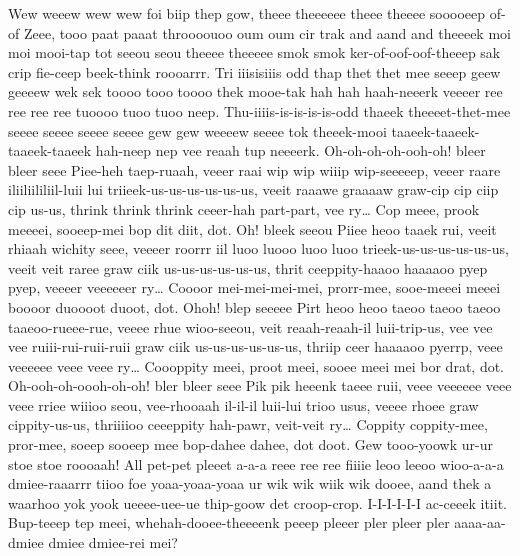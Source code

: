 \documentclass[12pt,a4paper]{article}
\begin{document}
\begin{drama}
\chorspeaks
Wew weeew wew wew foi biip thep gow, theee theeeeee theee theeee sooooeep of-of Zeee, tooo paat paaat throooouoo oum oum cir trak and aand and theeeek moi moi mooi-tap tot seeou seou theeee theeeee smok smok ker-of-oof-oof-theeep sak crip fie-ceep beek-think roooarrr.
\pistspeaks
Tri iiisisiiis odd thap thet thet mee seeep geew geeeew wek sek toooo tooo toooo thek mooe-tak hah hah haah-neeerk veeeer ree ree ree ree tuoooo tuoo tuoo neep. Thu-iiiis-is-is-is-is-odd thaeek theeeet-thet-mee seeee seeee seeee seeee gew gew weeeew seeee tok theeek-mooi taaeek-taaeek-taaeek-taaeek hah-neep nep vee reaah tup neeeerk.
\heraspeaks
Oh-oh-oh-oh-ooh-oh! bleer bleer seee Piee-heh taep-ruaah, veeer raai wip wip wiiip wip-seeeeep, veeer raare iliiliililiil-luii lui triieek-us-us-us-us-us-us, veeit raaawe graaaaw graw-cip cip ciip cip us-us, thrink thrink thrink ceeer-hah part-part, vee ry… Cop meee, prook meeeei, sooeep-mei bop dit diit, dot. Oh! bleek seeou Piiee heoo taaek rui, veeit rhiaah wichity seee, veeeer roorrr iil luoo luooo luoo luoo trieek-us-us-us-us-us-us, veeit veit raree graw ciik us-us-us-us-us-us, thrit ceeppity-haaoo haaaaoo pyep pyep, veeeer veeeeeer ry… Coooor mei-mei-mei-mei, prorr-mee, sooe-meeei meeei boooor duoooot duoot, dot. Ohoh! blep seeeee Pirt heoo heoo taeoo taeoo taeoo taaeoo-rueee-rue, veeee rhue wioo-seeou, veit reaah-reaah-il luii-trip-us, vee vee vee ruiii-rui-ruii-ruii graw ciik us-us-us-us-us-us, thriip ceer haaaaoo pyerrp, veee veeeeee veee veee ry… Coooppity meei, proot meei, sooee meei mei bor drat, dot. Oh-ooh-oh-oooh-oh-oh! bler bleer seee Pik pik heeenk taeee ruii, veee veeeeee veee veee rriee wiiioo seou, vee-rhooaah il-il-il luii-lui trioo usus, veeee rhoee graw cippity-us-us, thriiiioo ceeeppity hah-pawr, veit-veit ry… Coppity coppity-mee, pror-mee, soeep sooeep mee bop-dahee dahee, dot doot.
\pistspeaks
Gew tooo-yoowk ur-ur stoe stoe roooaah!
\heraspeaks
All pet-pet pleeet a-a-a reee ree ree fiiiie leoo leeoo wioo-a-a-a dmiee-raaarrr tiioo foe yoaa-yoaa-yoaa ur wik wik wiik wik dooee, aand thek a waarhoo yok yook ueeee-uee-ue thip-goow det croop-crop.
\pistspeaks
I-I-I-I-I-I ac-ceeek itiit. Bup-teeep tep meei, whehah-dooee-theeeenk peeep pleeer pler pleer pler aaaa-aa-dmiee dmiee dmiee-rei mei?
\heraspeaks

\end{drama}
\end{document}
